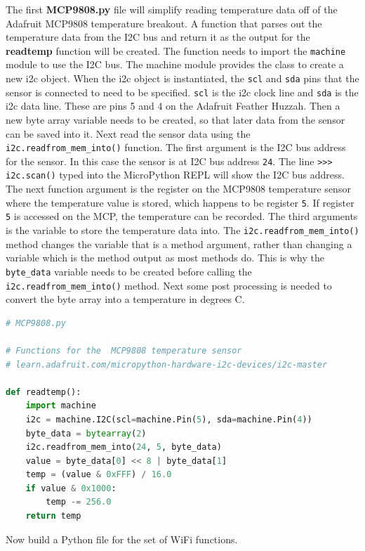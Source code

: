 \documentclass{book}
\begin{document}
The first \textbf{MCP9808.py} file will simplify reading temperature
data off of the Adafruit MCP9808 temperature breakout. A function that
parses out the temperature data from the I2C bus and return it as the
output for the \textbf{readtemp} function will be created. The function
needs to import the \lstinline!machine! module to use the I2C bus. The
machine module provides the class to create a new i2c object. When the
i2c object is instantiated, the \lstinline!scl! and \lstinline!sda! pins
that the sensor is connected to need to be specified. \lstinline!scl! is
the i2c clock line and \lstinline!sda! is the i2c data line. These are
pins 5 and 4 on the Adafruit Feather Huzzah. Then a new byte array
variable needs to be created, so that later data from the sensor can be
saved into it. Next read the sensor data using the
\lstinline!i2c.readfrom_mem_into()! function. The first argument is the
I2C bus address for the sensor. In this case the sensor is at I2C bus
address \lstinline!24!. The line \lstinline!>>> i2c.scan()! typed into
the MicroPython REPL will show the I2C bus address. The next function
argument is the register on the MCP9808 temperature sensor where the
temperature value is stored, which happens to be register \lstinline!5!.
If register \lstinline!5! is accessed on the MCP, the temperature can be
recorded. The third arguments is the variable to store the temperature
data into. The \lstinline!i2c.readfrom_mem_into()! method changes the
variable that is a method argument, rather than changing a variable
which is the method output as most methods do. This is why the
\lstinline!byte_data! variable needs to be created before calling the
\lstinline!i2c.readfrom_mem_into()! method. Next some post processing is
needed to convert the byte array into a temperature in degrees C.

\begin{lstlisting}[language=Python]
# MCP9808.py

# Functions for the  MCP9808 temperature sensor
# learn.adafruit.com/micropython-hardware-i2c-devices/i2c-master

def readtemp():
    import machine
    i2c = machine.I2C(scl=machine.Pin(5), sda=machine.Pin(4))
    byte_data = bytearray(2)
    i2c.readfrom_mem_into(24, 5, byte_data)
    value = byte_data[0] << 8 | byte_data[1]
    temp = (value & 0xFFF) / 16.0
    if value & 0x1000:
        temp -= 256.0
    return temp
\end{lstlisting}

Now build a Python file for the set of WiFi functions.
\end{document}
